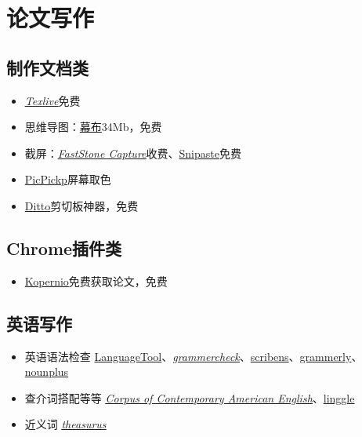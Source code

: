 \documentclass[UTF8,oneside]{ctexbook}
\begin{document}
\section{论文写作}
\subsection{制作文档类}
\begin{itemize}
	\item \underline{\textit{\href{https://mirrors.tuna.tsinghua.edu.cn/CTAN/systems/texlive/Images/}{Texlive}}}\quad 免费
	\item 思维导图：\href{https://mubu.com}{幕布}\quad 34Mb，免费
	\item 截屏：\underline{\textit{\href{http://www.faststone.org/FSCaptureDetail.htm}{FastStone Capture}}}\quad 收费、\href{https://www.snipaste.com}{Snipaste}\quad 免费
	\item \href{https://picpick.app/zh/}{PicPickp}\quad 屏幕取色
	\item \href{https://ditto-cp.sourceforge.io}{Ditto}\quad 剪切板神器，免费
\end{itemize}

\subsection{Chrome插件类}
\begin{itemize}
	\item \href{https://kopernio.com}{Kopernio}\quad 免费获取论文，免费
\end{itemize}

\subsection{英语写作}
\begin{itemize}
	\item 英语语法检查 \href{https://languagetool.org}{LanguageTool}、\underline{\textit{\href{https://www.grammarcheck.net}{grammercheck}}}、\href{https://www.scribens.com}{scribens}、\href{https://www.grammarly.com}{grammerly}、\href{https://www.nounplus.net}{nounplus}
	\item 查介词搭配等等 \underline{\textit{\href{https://www.english-corpora.org/coca/}{ Corpus of Contemporary American English}}}、\href{https://www.lintcode.com}{linggle}
	\item 近义词 \underline{\textit{\href{https://www.thesaurus.com}{theasurus}}}
\end{itemize}
\end{document}
